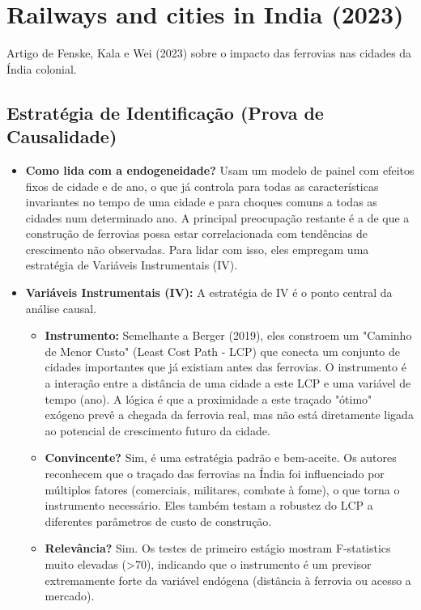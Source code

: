 \documentclass[12pt, a4paper]{article}
\begin{document}
\section{ Railways and cities in India (2023)}
Artigo de Fenske, Kala e Wei (2023) sobre o impacto das ferrovias nas cidades da Índia colonial.

\subsection{Estratégia de Identificação (Prova de Causalidade)}
\begin{itemize}
    \item \textbf{Como lida com a endogeneidade?} Usam um modelo de painel com efeitos fixos de cidade e de ano, o que já controla para todas as características invariantes no tempo de uma cidade e para choques comuns a todas as cidades num determinado ano. A principal preocupação restante é a de que a construção de ferrovias possa estar correlacionada com tendências de crescimento não observadas. Para lidar com isso, eles empregam uma estratégia de Variáveis Instrumentais (IV).

    \item \textbf{Variáveis Instrumentais (IV):} A estratégia de IV é o ponto central da análise causal.
    \begin{itemize}
        \item \textbf{Instrumento:} Semelhante a Berger (2019), eles constroem um "Caminho de Menor Custo" (Least Cost Path - LCP) que conecta um conjunto de cidades importantes que já existiam antes das ferrovias. O instrumento é a interação entre a distância de uma cidade a este LCP e uma variável de tempo (ano). A lógica é que a proximidade a este traçado "ótimo" exógeno prevê a chegada da ferrovia real, mas não está diretamente ligada ao potencial de crescimento futuro da cidade.
        \item \textbf{Convincente?} Sim, é uma estratégia padrão e bem-aceite. Os autores reconhecem que o traçado das ferrovias na Índia foi influenciado por múltiplos fatores (comerciais, militares, combate à fome), o que torna o instrumento necessário. Eles também testam a robustez do LCP a diferentes parâmetros de custo de construção.
        \item \textbf{Relevância?} Sim. Os testes de primeiro estágio mostram F-statistics muito elevadas (>70), indicando que o instrumento é um previsor extremamente forte da variável endógena (distância à ferrovia ou acesso a mercado).
    \end{itemize}


\end{itemize}
\end{document}
